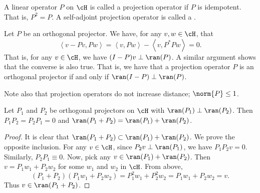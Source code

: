 \documentclass[oneside,reqno,letterpaper]{amsart}
\begin{document}
\begin{definition}
  A linear operator \(P\) on \(\cH\) is called a projection operator if \(P\) is idempotent. 
  That is, \(P^2 = P\). 
  A self-adjoint projection operator is called a . 
\end{definition}

Let \(P\) be an orthogonal projector. 
We have, for any \(v, w \in \cH\), that 
\[
  \left< v - Pv, Pw \right> 
  = \left< v, Pw \right> - \left< v, P^* P w \right>
  = 0. 
\] 
That is, for any \(v \in \cH\), we have \((I - P)v \perp \ran(P)\). 
A similar argument shows that the converse is also true.
That is, we have that a projection operator \(P\) is an orthogonal projector if and only if \(\ran(I - P) \perp \ran(P)\). 

Note also that projection operators do not increase distance; \(\norm{P} \leq 1\).

\begin{lemma}
\label{thm:orthogonal-projections}
  Let \(P_1\) and \(P_2\) be orthogonal projectors on \(\cH\) with \(\ran(P_1) \perp \ran(P_2)\).
  Then \(P_1P_2 = P_2P_1 = 0\) and \(\ran(P_1 + P_2) = \ran(P_1) + \ran(P_2)\). 
\end{lemma}
\begin{proof}
  It is clear that \(\ran(P_1 + P_2) \subset \ran(P_1) + \ran(P_2)\). 
  We prove the opposite inclusion. 
  For any \(v \in \cH\), since \(P_2v \perp \ran(P_1)\), we have \(P_1P_2v = 0\). 
  Similarly, \(P_2P_1 \equiv 0\). 
  Now, pick any \(v \in \ran(P_1) + \ran(P_2)\).
  Then \(v = P_1 w_1 + P_2 w_2\) for some \(w_1\) and \(w_2\) in \(\cH\).  
  From above, 
  \[
    (P_1 + P_2)(P_1w_1 + P_2w_2)
    = P_1^2 w_1 + P_2^2 w_2
    = P_1w_1 + P_2 w_2
    = v.
  \] 
  Thus \(v \in \ran(P_1 + P_2)\). 
\end{proof}

\end{document}
